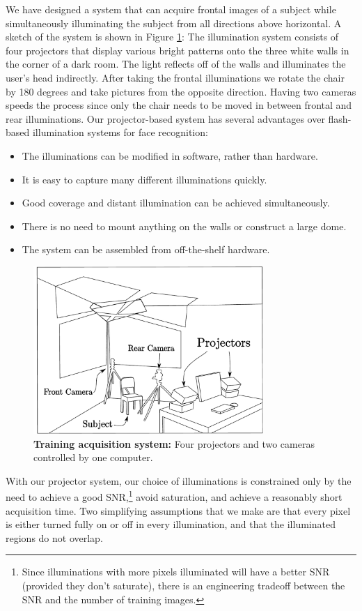 We have designed a system that can acquire frontal images of a subject while
simultaneously illuminating the subject from all directions above horizontal. A sketch of the
system is shown in Figure \ref{fig:system}: The illumination
system consists of four projectors that display various bright
patterns onto the three white walls in the corner of a dark
room.  The light reflects off of the walls and illuminates the
user's head indirectly.  After taking the frontal illuminations
we rotate the chair by 180 degrees and take pictures from the
opposite direction.  Having two cameras speeds the process
since only the chair needs to be moved in between frontal and
rear illuminations. Our projector-based system has several
advantages over flash-based illumination systems for face recognition:
\begin{itemize}
\item The illuminations can be modified in software, rather than hardware.
\item It is easy to capture many different illuminations quickly.
\item Good coverage and distant illumination can be achieved simultaneously.
\item There is no need to mount anything on the walls or construct a large dome.
\item The system can be assembled from off-the-shelf hardware.
\end{itemize}
\begin{figure}
\centering
\includegraphics[height=2.5in]{figures_pami/camera_rig.pdf}
\caption{\small{\bf Training acquisition system:} Four projectors and two cameras controlled by one computer.}
\label{fig:system}
\end{figure}
With our projector system, our choice of illuminations is
constrained only by the need to achieve a good
SNR,\footnote{Since illuminations with more pixels illuminated
will have a better SNR (provided they don't saturate), there is
an engineering tradeoff between the SNR and the number of
training images.} avoid saturation, and achieve a reasonably
short acquisition time.  Two simplifying assumptions that we
make are that every pixel is either turned fully on or off in
every illumination, and that the illuminated regions do not
overlap.

